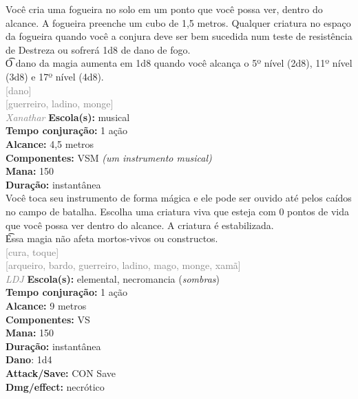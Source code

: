 \documentclass{RPG_Adventure}[2021/10/20]
\begin{document}
{\normalsize Você cria uma fogueira no solo em um ponto que você possa ver, dentro do alcance. A fogueira preenche um cubo de 1,5 metros. Qualquer criatura no espaço da fogueira quando você a conjura deve ser bem sucedida num teste de resistência de Destreza ou sofrerá 1d8 de dano de fogo.\\\t O dano da magia aumenta em 1d8 quando você alcança o 5º nível (2d8), 11º nível (3d8) e 17º nível (4d8).\\}
{\scriptsize \textcolor{gray}{[dano]\\}}
{\scriptsize \textcolor{gray}{[guerreiro, ladino, monge]\\}}
{\tiny \textcolor{gray}{\textit{Xanathar}}}\jump{}
{\small \t \textbf{Escola(s):} musical\\\t \textbf{Tempo conjuração:} 1 ação\\\t \textbf{Alcance:} 4,5 metros\\\t \textbf{Componentes:} VSM \textit{(um instrumento musical)}\\\t \textbf{Mana:} 150\\\t \textbf{Duração:} instantânea\\}
{\normalsize Você toca seu instrumento de forma mágica e ele pode ser ouvido até pelos caídos no campo de batalha. Escolha uma criatura viva que esteja com 0 pontos de vida que você possa ver dentro do alcance. A criatura é estabilizada.\\\t Essa magia não afeta mortos-vivos ou constructos.\\}
{\scriptsize \textcolor{gray}{[cura, toque]\\}}
{\scriptsize \textcolor{gray}{[arqueiro, bardo, guerreiro, ladino, mago, monge, xamã]\\}}
{\tiny \textcolor{gray}{\textit{LDJ}}}\jump{}
{\small \t \textbf{Escola(s):} elemental, necromancia (\textit{sombras})\\\t \textbf{Tempo conjuração:} 1 ação\\\t \textbf{Alcance:} 9 metros\\\t \textbf{Componentes:} VS\\\t \textbf{Mana:} 150\\\t \textbf{Duração:} instantânea\\\t \textbf{Dano}: 1d4\\\t \textbf{Attack/Save:} CON Save\\\t \textbf{Dmg/effect:} necrótico\\}
\end{document}
